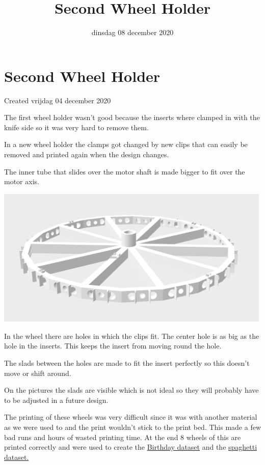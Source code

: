 \documentclass{scrartcl}
\title{Second Wheel Holder}
\date{dinsdag 08 december 2020}
\author{}
\begin{document}
\maketitle

		\section{Second Wheel Holder}

Created vrijdag 04 december 2020



The first wheel holder wasn't good because the inserts where clamped in with the knife side so it was very hard to remove them.

In a new wheel holder the clamps got changed by new clips that can easily be removed and printed again when the design changes. 

The inner tube that slides over the motor shaft is made bigger to fit over the motor axis.



\includegraphics[width=5.208333in, keepaspectratio=true]{./Second_Wheel_Holder/radhouder_v2.png}



In the wheel there are holes in which the clips fit. The center hole is as big as the hole in the inserts. This keeps the insert from moving round the hole.

The slads between the holes are made to fit the insert perfectly so this doesn't move or shift around. 



On the pictures the slads are visible which is not ideal so they will probably have to be adjusted in a future design.



The printing of these wheels was very difficult since it was with another material as we were used to and the print wouldn't stick to the print bed. This made a few bad runs and hours of wasted printing time. At the end 8 wheels of this are printed correctly and were used to create the \href{../../../Vision/Dataset/automated_datasets/2_created_datasets/1_Birthday_dataset.tex}{Birthday dataset} and the \href{../../../Vision/Dataset/automated_datasets/2_created_datasets/2_Spaghetti_dataset.tex}{spaghetti dataset.}
\end{document}
